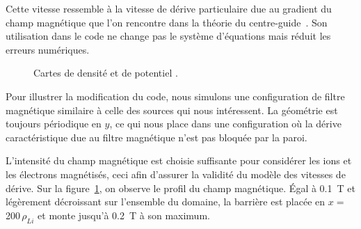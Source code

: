 \begin{refsection}
Cette vitesse ressemble à la vitesse de dérive particulaire due au gradient du
champ magnétique que l'on rencontre dans la théorie du
centre-guide~\parencite{Lee}. Son utilisation dans le code ne change pas le
système d'équations mais réduit les erreurs numériques.

\begin{figure}[!htbp]
    \centering
    \caption{Cartes de densité  et de
    potentiel
    .}
    \label{2-CartesMagBarrier}
\end{figure}

Pour illustrer la modification du code, nous simulons une configuration de
filtre magnétique similaire à celle des sources qui nous intéressent. 
La géométrie est toujours périodique en $y$, ce qui nous place dans une
configuration où la dérive caractéristique due au filtre magnétique n'est pas
bloquée par la paroi.

L'intensité du champ
magnétique est choisie suffisante pour considérer les ions et les électrons
magnétisés, ceci afin d'assurer la validité du modèle des vitesses de dérive.
Sur la figure~\ref{2-CartesMagBarrier}, on observe le profil du champ
magnétique. Égal à 0.1~T et légèrement décroissant sur l'ensemble du domaine,
la barrière est placée en $x=\,$200$\,\rho_{Li}$ et monte jusqu'à 0.2~T à son maximum.


\end{refsection}
